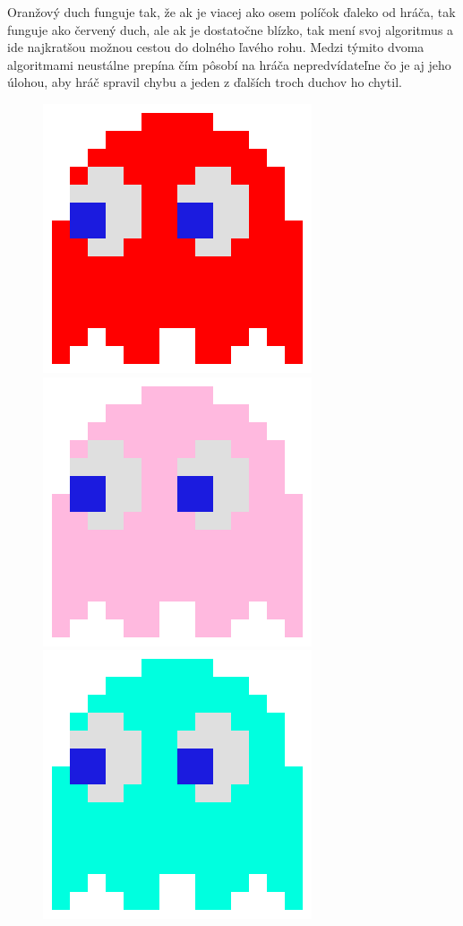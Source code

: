 \documentclass[10pt,oneside,slovak,a4paper]{article}
\begin{document}
Oranžový duch funguje tak, že ak je viacej ako osem políčok ďaleko od hráča, tak funguje ako červený duch, ale ak je dostatočne blízko, tak mení svoj algoritmus a ide najkratšou možnou cestou do dolného ľavého rohu. Medzi týmito dvoma algoritmami neustálne prepína čím pôsobí na hráča nepredvídateľne čo je aj jeho úlohou, aby hráč spravil chybu a jeden z ďalších troch duchov ho chytil.
\begin{figure}[tbh]
	\centering
	\includegraphics[scale=0.2]{redGhost.png}
	\includegraphics[scale=0.2]{pinkGhost.png}
	\includegraphics[scale=0.2]{blueGhost.png}

\end{figure}
\end{document}
